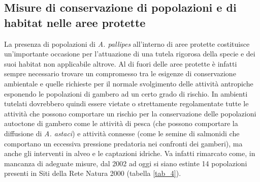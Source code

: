 \documentclass[11pt,a4paper,italian,twoside,openany]{memoir}
\begin{document}
\subsection{Misure di conservazione di popolazioni e di habitat nelle aree protette}
La presenza di popolazioni di \emph{A. pallipes} all'interno di aree protette costituisce un'importante occasione per l'attuazione di una tutela rigorosa della specie e dei suoi habitat non applicabile altrove. Al di fuori delle aree protette è infatti sempre necessario trovare un compromesso tra le esigenze di conservazione ambientale e quelle richieste per il normale svolgimento delle attività antropiche esponendo le popolazioni di gambero ad un certo grado di rischio. In ambienti tutelati dovrebbero quindi essere vietate o strettamente regolamentate tutte le attività che possono comportare un rischio per la conservazione delle popolazioni autoctone di gambero come le attività di pesca (che possono comportare la diffusione di \emph{A. astaci}) e attività connesse (come le semine di salmonidi che comportano un eccessiva pressione predatoria nei confronti dei gamberi), ma anche gli interventi in alveo e le captazioni idriche. Va infatti rimarcato come, in mancanza di adeguate misure, dal 2002 ad oggi si siano estinte 14 popolazioni presenti in Siti della Rete Natura 2000 (tabella \ref{tab_4}).
\end{document}

